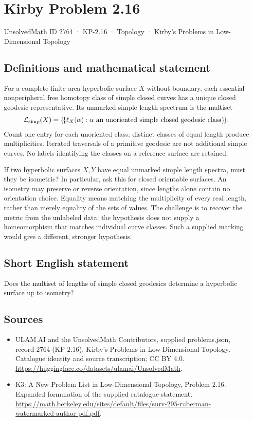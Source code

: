 \documentclass[11pt,a4paper]{article}
\begin{document}
\section*{Kirby Problem 2.16}\label{2764}
{\small UnsolvedMath ID 2764 · KP-2.16 · Topology · Kirby's Problems in Low-Dimensional Topology}
\subsection{Definitions and mathematical statement}
For a complete finite-area hyperbolic surface $X$ without boundary, each
essential nonperipheral
free homotopy class of simple closed curves has a unique closed geodesic
representative. Its unmarked simple length spectrum is the multiset
\[
\mathcal L_{\rm simp}(X)=
\{\!\{\ell_X(\alpha):\alpha\text{ an unoriented simple closed
geodesic class}\}\!\}.
\]
Count one entry for each unoriented class; distinct classes of equal length
produce multiplicities. Iterated traversals of a primitive geodesic are not
additional simple curves. No labels identifying the classes on a reference
surface are retained.

If two hyperbolic surfaces $X,Y$ have equal unmarked simple length spectra,
must they be isometric? In particular, ask this for closed orientable surfaces.
An isometry may preserve or reverse orientation, since lengths alone contain no
orientation choice.
Equality means matching the multiplicity of every real length, rather than
merely equality of the sets of values. The challenge is to recover the metric
from the unlabeled data; the hypothesis does not supply a homeomorphism that
matches individual curve classes. Such a supplied marking would give a
different, stronger hypothesis.
\subsection{Short English statement}
Does the multiset of lengths of simple closed geodesics determine a hyperbolic surface up to isometry?
\subsection{Sources}
\begin{itemize}
\item[S1] ULAM.AI and the UnsolvedMath Contributors, supplied problems.json, record 2764 (KP-2.16), Kirby's Problems in Low-Dimensional Topology. Catalogue identity and source transcription; CC BY 4.0.
\url{https://huggingface.co/datasets/ulamai/UnsolvedMath}.
\item[S2] K3: A New Problem List in Low-Dimensional Topology, Problem 2.16. Expanded formulation of the supplied catalogue statement.
\url{https://math.berkeley.edu/sites/default/files/surv-295-ruberman-watermarked-author-pdf.pdf}.
\end{itemize}
\end{document}
